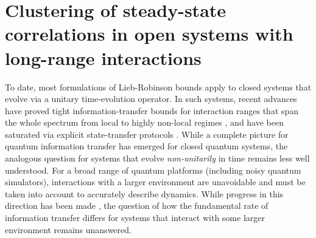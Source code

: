 \section{Clustering of steady-state correlations in open systems with long-range interactions}
\label{ch:occ}

To date, most  formulations of Lieb-Robinson bounds apply to closed systems that evolve  via a unitary time-evolution operator.
In such systems, recent advances have proved tight information-transfer bounds for interaction ranges that span the whole spectrum from local \cite{ChenLucas2021graphtheory,WangHazzard2020} to highly non-local regimes \cite{Tran2019a,Chen2019,kuwaharaStrictlyLinearLight2020,Tran2021b}, and have been saturated via explicit state-transfer protocols \cite{Eldredge2017,Tran2020hierarchylinearlightcones,Tran2021a}.
While a complete picture for quantum information transfer has emerged for closed quantum systems,  the analogous question for systems that evolve \textit{non-unitarily} in time remains less well understood.
For a broad range of quantum platforms (including noisy quantum simulators), interactions with a  larger environment are unavoidable and must be taken into account to accurately describe dynamics.
While progress in this direction has been made \cite{poulin2010, descamps2013, cubitt2015, Kastoryano2013, Sweke2019}, the question of how the fundamental rate of information transfer differs for systems that interact with some larger environment remains unanswered.

